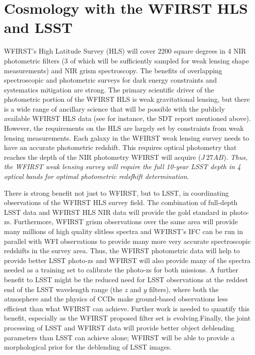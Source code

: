%
%
%
%

\section{Cosmology with the WFIRST HLS and LSST}
\def\secname{\chpname:weaklensing}\label{sec:\secname}


WFIRST's High Latitude Survey (HLS) will cover
2200 square degrees in 4 NIR photometric filters
(3 of which will be sufficiently sampled for weak lensing shape
measurements) and NIR grism spectroscopy.  The benefits of overlapping
spectroscopic and photometric surveys for dark energy constraints and
systematics mitigation are strong.  The primary scientific driver of the
photometric portion of the WFIRST HLS is weak gravitational lensing,
but there is a wide range of ancillary science that will be possible
with the publicly available WFIRST HLS data (see for instance, the SDT
report mentioned above).  However, the requirements on the HLS are
largely set by constraints from weak lensing measurements.  Each galaxy
in the WFIRST weak lensing survey needs to have an accurate photometric
redshift.  This requires optical photometry that reaches the depth of
the NIR photometry WFIRST will acquire ($J~27AB$).  \emph{Thus, the
WFIRST weak lensing survey will require the full  10-year LSST depth in
4 optical bands for optimal photometric redsfhift determination}.

There is strong benefit not just to WFIRST, but to LSST, in coordinating
observations of the WFIRST HLS survey field. The combination of
full-depth LSST data and WFIRST HLS NIR data will provide the gold
standard in photo-zs.  Furthermore, WFIRST grism observations over the
same area will provide many millions of high quality slitless spectra
and WFIRST's IFC can be run in parallel with WFI observations to provide
many more very accurate spectroscopic redshifts in the survey area.
Thus, the WFIRST photometric data will help to provide better LSST
photo-zs and  WFIRST will also provide many of the spectra needed as a
training set to calibrate the photo-zs for both missions.  A further
benefit to LSST might be the reduced need for LSST observations at the
reddest end of the LSST wavelength range (the $z$ and $y$ filters), where
both the atmosphere and the physics of CCDs make ground-based
observations less efficient than what WFIRST can achieve. Further work is needed to quantify this benefit, especially as the WFIRST proposed filter set is evolving.Finally, the
joint processing of LSST and WFIRST data will provide better object
deblending parameters than LSST can achieve alone; WFIRST will be able
to provide a morphological prior for the deblending of LSST images.

